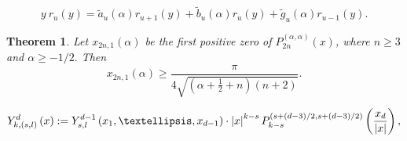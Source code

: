 \documentclass[10pt,a4paper]{amsart}
\newtheorem{theorem}{Theorem}
\begin{document}
\begin{equation}
 y \ r_{u} \left( y \right) =
 \widetilde{a}_{u}\left( \alpha \right) r_{u+1} \left(
	y \right) +\widetilde{b}_{u}\left( \alpha \right)  
r_{u} \left( y  \right)  +\widetilde{g}_{u}\left( \alpha \right)
 r_{u - 1} \left(
	 y  \right).  \label{eqrec3}
\end{equation}

\begin{theorem} \label{Elbert}
Let $x_{2n,1}\left( \alpha \right) $ be the first positive zero of $
P_{2n}^{\left( \alpha ,\alpha \right) }\left( x\right) $, where $n\geq 3$ and $\alpha \geq -1/2.$ Then 
\begin{equation*}
x_{2n,1}\left( \alpha \right) \geq \frac{\pi }{4\sqrt{\left( \alpha +\frac{1
}{2}+n\right) \left( n+2\right) }}.
\end{equation*}

\end{theorem}

\begin{equation}
Y_{k,\left( s,l\right) }^{d}\left( x\right) 
:=
Y_{s,l}^{d-1}\left(
x_{1},\dots,x_{d-1}\right) \cdot \left\vert x\right\vert ^{k-s}P_{k-s}^{\left(
s+\left( d-3\right) /2, s+\left( d-3\right) /2\right) }\left( \frac{x_{d}}{%
\left\vert x\right\vert }\right)   \label{eqintFF},
\end{equation}
\end{document}
